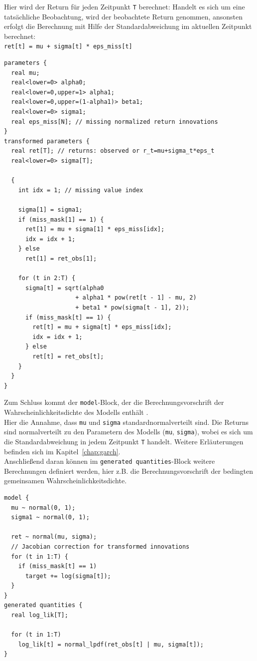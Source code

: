 \documentclass[ngerman]{ttlab-qualify}
\begin{document}
Hier wird der Return für jeden Zeitpunkt \verb|T| berechnet: Handelt es sich um eine tatsächliche Beobachtung, wird der beobachtete Return genommen, ansonsten erfolgt die Berechnung mit Hilfe der Standardabweichung im aktuellen Zeitpunkt berechnet:\\
\verb|ret[t] = mu + sigma[t] * eps_miss[t]|

\begin{lstlisting}[style=custom]
parameters {
  real mu;
  real<lower=0> alpha0;
  real<lower=0,upper=1> alpha1;
  real<lower=0,upper=(1-alpha1)> beta1;
  real<lower=0> sigma1;
  real eps_miss[N]; // missing normalized return innovations
}
transformed parameters {
  real ret[T]; // returns: observed or r_t=mu+sigma_t*eps_t
  real<lower=0> sigma[T];

  {
    int idx = 1; // missing value index

    sigma[1] = sigma1;
    if (miss_mask[1] == 1) {
      ret[1] = mu + sigma[1] * eps_miss[idx];
      idx = idx + 1;
    } else
      ret[1] = ret_obs[1];

    for (t in 2:T) {
      sigma[t] = sqrt(alpha0
                    + alpha1 * pow(ret[t - 1] - mu, 2)
                    + beta1 * pow(sigma[t - 1], 2));
      if (miss_mask[t] == 1) {
        ret[t] = mu + sigma[t] * eps_miss[idx];
        idx = idx + 1;
      } else
        ret[t] = ret_obs[t];
    }
  }
}
\end{lstlisting}

Zum Schluss kommt der \verb|model|-Block, der die Berechnungsvorschrift der Wahrscheinlichkeitsdichte des Modells enthält \parencite{stan:2017}.\\
Hier die Annahme, dass \verb|mu| und \verb|sigma| standardnormalverteilt sind. Die Returns sind normalverteilt zu den Parametern des Modells (\verb|mu|, \verb|sigma|), wobei es sich um die Standardabweichung in jedem Zeitpunkt \verb|T| handelt. Weitere Erläuterungen befinden sich im Kapitel~\ref{chap:garch}. \\

Anschließend daran können im \verb|generated quantities|-Block weitere Berechnungen definiert werden, hier z.B. die Berechnungsvorschrift der bedingten gemeinsamen Wahrscheinlichkeitsdichte.

\begin{lstlisting}[style=custom]
model {
  mu ~ normal(0, 1);
  sigma1 ~ normal(0, 1);

  ret ~ normal(mu, sigma);
  // Jacobian correction for transformed innovations
  for (t in 1:T) {
    if (miss_mask[t] == 1)
      target += log(sigma[t]);
  }
}
generated quantities {
  real log_lik[T];

  for (t in 1:T)
    log_lik[t] = normal_lpdf(ret_obs[t] | mu, sigma[t]);
}

\end{lstlisting}
\end{document}
